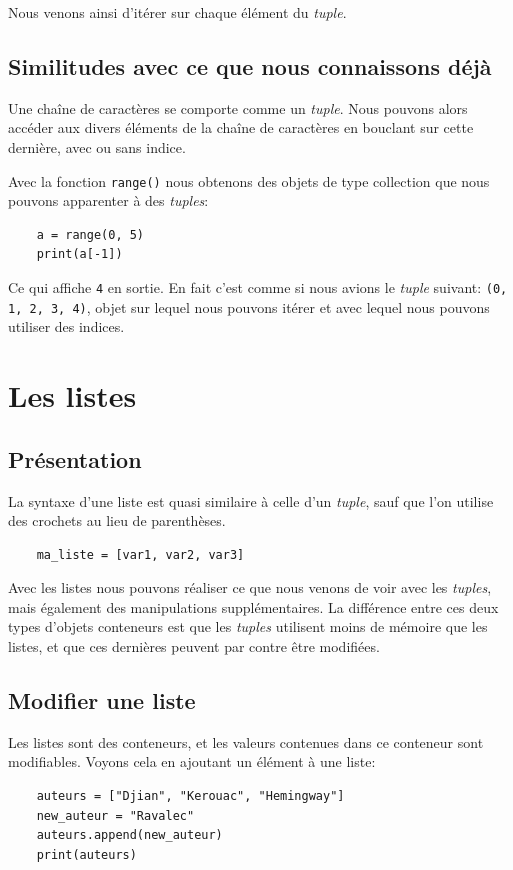 \documentclass[a4paper,11pt]{book}
\begin{document}
Nous venons ainsi d'itérer sur chaque élément du \textit{tuple}.

\subsection*{Similitudes avec ce que nous connaissons déjà}
Une chaîne de caractères se comporte comme un \textit{tuple}. Nous pouvons alors accéder aux divers éléments de la chaîne de caractères en bouclant sur cette dernière, avec ou sans indice.
\medskip

Avec la fonction \texttt{range()} nous obtenons des objets de type collection que nous pouvons apparenter à des \textit{tuples}:
\begin{verbatim}
    a = range(0, 5)
    print(a[-1])
\end{verbatim}
\medskip

Ce qui affiche \texttt{4} en sortie. En fait c'est comme si nous avions le \textit{tuple} suivant: \texttt{(0, 1, 2, 3, 4)}, objet sur lequel nous pouvons itérer et avec lequel nous pouvons utiliser des indices.
\medskip

\section{Les listes}
\subsection*{Présentation}
La syntaxe d'une liste est quasi similaire à celle d'un \textit{tuple}, sauf que l'on utilise des crochets au lieu de parenthèses.
\begin{verbatim}
    ma_liste = [var1, var2, var3]
\end{verbatim}
\medskip

Avec les listes nous pouvons réaliser ce que nous venons de voir avec les \textit{tuples}, mais également des manipulations supplémentaires. La différence entre ces deux types d'objets conteneurs est que les \textit{tuples} utilisent moins de mémoire que les listes, et que ces dernières peuvent par contre être modifiées.
\medskip

\subsection*{Modifier une liste}
Les listes sont des conteneurs, et les valeurs contenues dans ce conteneur sont modifiables. Voyons cela en ajoutant un élément à une liste:
\begin{verbatim}
    auteurs = ["Djian", "Kerouac", "Hemingway"]
    new_auteur = "Ravalec"
    auteurs.append(new_auteur)
    print(auteurs)
\end{verbatim}
\medskip
\end{document}
